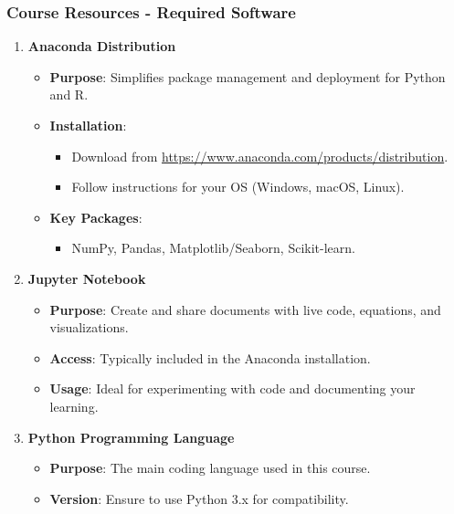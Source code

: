 \documentclass[aspectratio=169]{beamer}
\begin{document}
\begin{frame}
    \frametitle{Course Resources - Required Software}
    \begin{enumerate}
        \item \textbf{Anaconda Distribution}
            \begin{itemize}
                \item \textbf{Purpose}: Simplifies package management and deployment for Python and R.
                \item \textbf{Installation}:
                    \begin{itemize}
                        \item Download from \url{https://www.anaconda.com/products/distribution}.
                        \item Follow instructions for your OS (Windows, macOS, Linux).
                    \end{itemize}
                \item \textbf{Key Packages}:
                    \begin{itemize}
                        \item NumPy, Pandas, Matplotlib/Seaborn, Scikit-learn.
                    \end{itemize}
            \end{itemize}
        
        \item \textbf{Jupyter Notebook}
            \begin{itemize}
                \item \textbf{Purpose}: Create and share documents with live code, equations, and visualizations.
                \item \textbf{Access}: Typically included in the Anaconda installation.
                \item \textbf{Usage}: Ideal for experimenting with code and documenting your learning.
            \end{itemize}
        
        \item \textbf{Python Programming Language}
            \begin{itemize}
                \item \textbf{Purpose}: The main coding language used in this course.
                \item \textbf{Version}: Ensure to use Python 3.x for compatibility.
            \end{itemize}
    \end{enumerate}
\end{frame}
\end{document}

